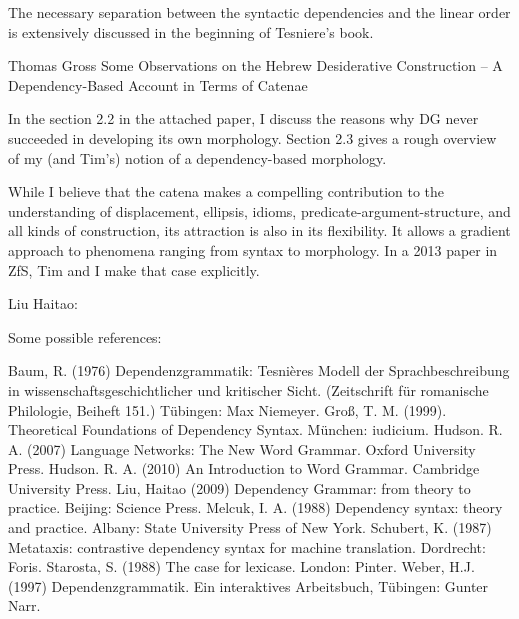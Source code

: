 










The necessary separation between the syntactic dependencies and the linear order is extensively
discussed in the beginning of Tesniere's book.


Thomas Gross
Some Observations on the Hebrew Desiderative Construction – A Dependency-Based Account in Terms of Catenae

In the section 2.2 in the attached paper, I discuss the reasons why DG never succeeded in developing its own morphology. Section 2.3 gives a rough overview of my (and Tim's) notion of a dependency-based morphology.

While I believe that the catena makes a compelling contribution to the understanding of displacement, ellipsis, idioms, predicate-argument-structure, and all kinds of construction, its attraction is also in its flexibility. It allows a gradient approach to phenomena ranging from syntax to morphology. In a 2013 paper in ZfS, Tim and I make that case explicitly.




Liu Haitao:

Some possible references:

Baum, R. (1976) Dependenzgrammatik: Tesnières Modell der Sprachbeschreibung in wissenschaftsgeschichtlicher und kritischer Sicht. (Zeitschrift für romanische Philologie, Beiheft 151.) Tübingen: Max Niemeyer.
Groß, T. M. (1999). Theoretical Foundations of Dependency Syntax. München: iudicium.
Hudson. R. A. (2007) Language Networks: The New Word Grammar. Oxford University Press.
Hudson. R. A. (2010) An Introduction to Word Grammar. Cambridge University Press.
Liu, Haitao (2009) Dependency Grammar: from theory to practice. Beijing: Science Press. 
Melcuk, I. A. (1988) Dependency syntax: theory and practice. Albany: State University Press of New York.
Schubert, K. (1987) Metataxis: contrastive dependency syntax for machine translation. Dordrecht: Foris.
Starosta, S. (1988) The case for lexicase. London: Pinter.
Weber, H.J. (1997) Dependenzgrammatik. Ein interaktives Arbeitsbuch, Tübingen: Gunter Narr.



